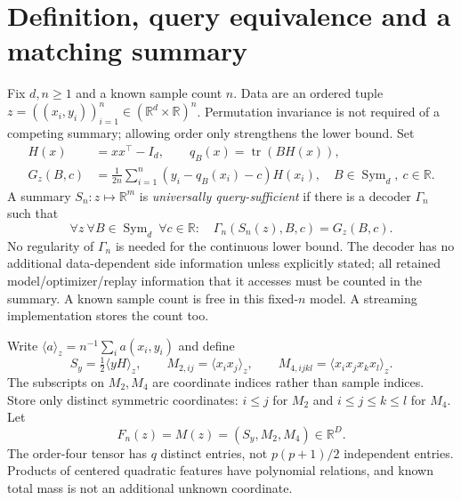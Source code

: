 \documentclass[11pt]{article}
\newcommand{\R}{\mathbb R}
\newcommand{\Sym}{\operatorname{Sym}}
\newcommand{\tr}{\operatorname{tr}}
\begin{document}
\section{Definition, query equivalence and a matching summary}

Fix $d,n\ge1$ and a known sample count $n$.  Data are an ordered tuple
$z=((x_i,y_i))_{i=1}^n\in(\R^d\times\R)^n$.  Permutation invariance is
not required of a competing summary; allowing order only strengthens the
lower bound. Set
\begin{align*}
 H(x)&=xx^\top-I_d,\qquad q_B(x)=\tr(BH(x)),\\
 G_z(B,c)&=\frac1{2n}\sum_{i=1}^n
       (y_i-q_B(x_i)-c)H(x_i),\quad B\in\Sym_d,\ c\in\R.
\end{align*}
A summary $S_n:z\mapsto\R^m$ is \emph{universally query-sufficient} if
there is a decoder $\Gamma_n$ such that
\[
 \forall z\ \forall B\in\Sym_d\ \forall c\in\R:
 \quad \Gamma_n(S_n(z),B,c)=G_z(B,c).
 \tag{U}
\]
No regularity of $\Gamma_n$ is needed for the continuous lower bound.
The decoder has no additional data-dependent side information unless
explicitly stated; all retained model/optimizer/replay information that
it accesses must be counted in the summary. A known sample count is free
in this fixed-$n$ model. A streaming implementation stores the count too.

Write $\langle a\rangle_z=n^{-1}\sum_i a(x_i,y_i)$ and define
\[
 S_y=\tfrac12\langle yH\rangle_z,\qquad
 M_{2,ij}=\langle x_ix_j\rangle_z,\qquad
 M_{4,ijkl}=\langle x_ix_jx_kx_l\rangle_z.
\]
The subscripts on $M_2,M_4$ are coordinate indices rather than sample
indices. Store only distinct symmetric coordinates: $i\le j$ for $M_2$
and $i\le j\le k\le l$ for $M_4$. Let
\[
 F_n(z)=M(z)=(S_y,M_2,M_4)\in\R^D.
\]
The order-four tensor has $q$ distinct entries, not $p(p+1)/2$ independent
entries. Products of centered quadratic features have polynomial
relations, and known total mass is not an additional unknown coordinate.
\end{document}
